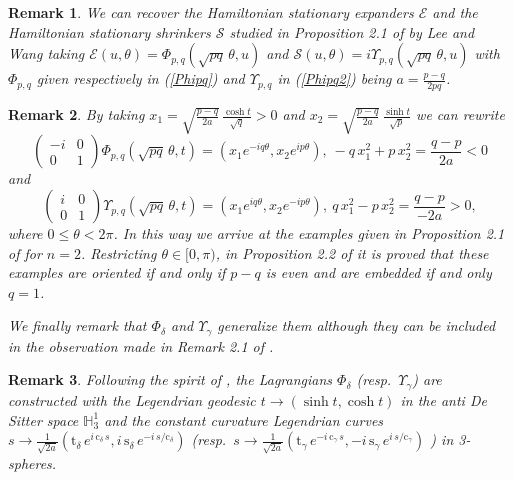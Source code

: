 \documentclass[leqno,11pt]{amsart}
\newtheorem{remark}{Remark}
\begin{document}
\begin{remark}
{\rm We can recover the Hamiltonian stationary expanders
$\mathcal{E}$ and the Hamiltonian stationary shrinkers
$\mathcal{S}$ studied in Proposition 2.1 of \cite{LW1} by Lee and
Wang taking
$\mathcal{E}(u,\theta)=\Phi_{p,q}(\sqrt{pq}\,\theta,u)$ and
$\mathcal{S}(u,\theta)=i\Upsilon_{p,q}(\sqrt{pq}\,\theta,u)$ with
$\Phi_{p,q}$ given respectively in (\ref{Phipq}) and
$\Upsilon_{p,q}$ in (\ref{Phipq2}) being $a=\frac{p-q}{2pq}$. }
\end{remark}
\begin{remark}
{\rm By taking $x_1=\sqrt{\frac{p-q}{2a}}\,\frac{\cosh
t}{\sqrt{q}} >0$ and $x_2=\sqrt{\frac{p-q}{2a}}\,\frac{\sinh
t}{\sqrt{p}}$ we can rewrite
$$ \left( \begin{array}{cc} -i
& 0 \\ 0 & 1 \end{array} \right)\Phi_{p,q}(\sqrt{pq}\,\theta,t)
=(x_1 e^{-iq\theta},x_2 e^{ip\theta}), \ -q\,x_1^2 + p \,x_2^2 =
\frac{q-p}{2a}<0 $$ and
$$ \left( \begin{array}{cc} i
& 0 \\ 0 & 1 \end{array}
\right)\Upsilon_{p,q}(\sqrt{pq}\,\theta,t) =(x_1 e^{iq\theta},x_2
e^{-ip\theta}), \ q\,x_1^2 - p \,x_2^2 = \frac{q-p}{-2a}>0, $$
where $ 0\leq \theta < 2\pi $. In this way we arrive at the
examples given in Proposition 2.1 of \cite{LW2} for $n=2$.
Restricting $\theta \in [0,\pi)$, in Proposition 2.2 of \cite{LW2}
it is proved that these examples are oriented if and only if $p-q$
is even and are embedded if and only $q=1$.

We finally remark that $\Phi_\delta$ and $\Upsilon_\gamma$
generalize them although they can be included in the observation
made in Remark 2.1 of \cite{LW2}.}
\end{remark}

\begin{remark}
{\rm Following the spirit of \cite{CCh}, the Lagrangians
$\Phi_\delta $ (resp.\ $\Upsilon_\gamma$) are constructed with the
Legendrian geodesic $t\rightarrow (\sinh t, \cosh t)$ in the anti
De Sitter space ${\mathbb{H}}^1_3$ and the constant curvature Legendrian
curves $s \rightarrow \frac{1}{\sqrt{2a}}(\mathrm{t}_\delta \,
e^{i\, \mathrm{c}_\delta\,s} ,i \,\mathrm{s}_\delta \,e^{-i\,s /
\mathrm{c}_\delta})$ (resp.\ $s \rightarrow
\frac{1}{\sqrt{2a}}(\mathrm{t}_\gamma \, e^{-i\,
\mathrm{c}_\gamma\,s},-i \, \mathrm{s}_\gamma \,e^{i\,s /
\mathrm{c}_\gamma})$ ) in 3-spheres.}
\end{remark}
\end{document}
